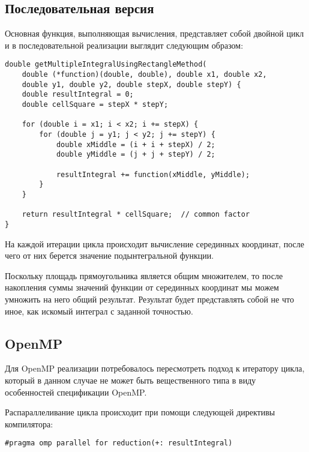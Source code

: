 \documentclass{article}
\begin{document}
\subsection{Последовательная версия}

\par Основная функция, выполняющая вычисления, представляет собой двойной цикл и в последовательной реализации выглядит следующим образом:
\vspace{10pt}
\begin{lstlisting}
double getMultipleIntegralUsingRectangleMethod(
    double (*function)(double, double), double x1, double x2,
    double y1, double y2, double stepX, double stepY) {
    double resultIntegral = 0;
    double cellSquare = stepX * stepY;

    for (double i = x1; i < x2; i += stepX) {
        for (double j = y1; j < y2; j += stepY) {
            double xMiddle = (i + i + stepX) / 2;
            double yMiddle = (j + j + stepY) / 2;

            resultIntegral += function(xMiddle, yMiddle);
        }
    }

    return resultIntegral * cellSquare;  // common factor
}
\end{lstlisting}

\par На каждой итерации цикла происходит вычисление серединных координат, после чего от них берется значение подынтегральной функции.

\par Поскольку площадь прямоугольника является общим множителем, то после накопления суммы значений функции от серединных координат мы можем умножить на него общий результат. Результат будет представлять собой не что иное, как искомый интеграл с заданной точностью.

\newpage

\subsection{OpenMP}

\par Для OpenMP реализации потребовалось пересмотреть подход к итератору цикла, который в данном случае не может быть вещественного типа в виду особенностей спецификации OpenMP.

\par Распараллеливание цикла происходит при помощи следующей директивы компилятора:

\vspace{10pt}
\begin{lstlisting}
#pragma omp parallel for reduction(+: resultIntegral)
\end{lstlisting}
\end{document}
